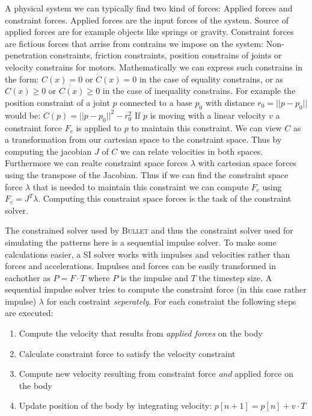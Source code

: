 \documentclass[english,ngerman]{KITreprt}
\newcommand{\name}[1]{\textsc{#1}}
\begin{document}
A physical system we can typically find two kind of forces: Applied
forces and constraint forces. Applied forces are the input forces of the
system. Source of applied forces are for example objects like springs or
gravity. Constraint forces are fictious forces that arrise from
contrains we impose on the system: Non-penetration constraints, friction
constraints, position constrains of joints or velocity constrains for
motors. Mathematically we can express such constrains in the form:
$C(x) = 0$ or $\dot{C}(x) = 0$ in the case of equality constrains, or as
$C(x) \geq 0$ or $\dot{C(x)} \geq 0$ in the case of inequality
constrains. For example the position constraint of a joint $p$ connected
to a base $p_0$ with distance $r_0 = ||p-p_0||$ would be:
$C(p) = || p - p_0 ||^2 - r_0^2$ If $p$ is moving with a linear velocity
$v$ a constraint force $F_c$ is applied to $p$ to maintain this
constraint. We can view $C$ as a transformation from our cartesian space
to the constraint space. Thus by computing the jacobian $J$ of $C$ we
can relate velocities in both spaces. Furthermore we can realte
constraint space forces $\lambda$ with cartesian space forces using the
transpose of the Jacobian. Thus if we can find the constraint space
force $\lambda$ that is needed to maintain this constraint we can
compute $F_c$ using $F_c = J^T \lambda$. Computing this constraint space
forces is the task of the constraint solver.

The constrained solver used by \name{Bullet} and thus the constraint
solver used for simulating the patterns here is a sequential impulse
solver. To make some calculations easier, a SI solver works with
impulses and velocities rather than forces and accelerations. Impulses
and forces can be easily transformed in eachother as $P = F \cdot T$
where $P$ is the impulse and $T$ the timestep size. A sequential impulse
solver tries to compute the constraint force (in this case rather
impulse) $\lambda$ for each costraint \emph{seperately}. For each
constraint the following steps are executed:

\begin{enumerate}
\def\labelenumi{\arabic{enumi}.}
\itemsep1pt\parskip0pt
\item
  Compute the velocity that results from \emph{applied forces} on the
  body
\item
  Calculate constraint force to satisfy the velocity constraint
\item
  Compute new velocity resulting from constraint force \emph{and}
  applied force on the body
\item
  Update position of the body by integrating velocity:
  $p[n+1] = p[n] + v \cdot T$
\end{enumerate}
\end{document}
